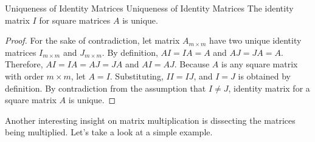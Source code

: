 \documentclass[../main.tex]{subfiles}
\begin{document}
\begin{theorem}{Uniqueness of Identity Matrices}
{Uniqueness of Identity Matrices}
The identity matrix $I$ for square matrices $A$ is unique.
\end{theorem}
\begin{proof}
For the sake of contradiction, let matrix $A_{m \times m}$ have two
unique identity matrices $I_{m \times m}$ and $J_{m \times m}$.
By definition, $AI = IA = A$ and $AJ = JA = A$. Therefore,
$AI = IA = AJ = JA$ and $AI = AJ$. Because $A$ is any square matrix
with order $m \times m$, let $A = I$. Substituting, $II = IJ$, and
$I = J$ is obtained by definition. By contradiction from the
assumption that $I \neq J$, identity matrix for a square matrix
$A$ is unique.
\end{proof}

Another interesting insight on matrix multiplication is dissecting
the matrices being multiplied. Let's take a look at a simple example.
\end{document}
